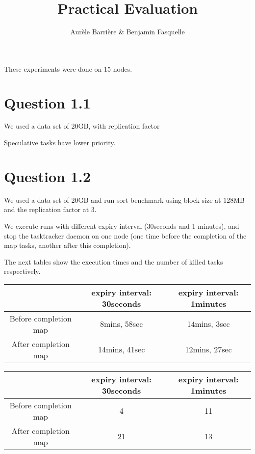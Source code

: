 \documentclass{article}
\author{Aur\`ele Barri\`ere \& Benjamin Fasquelle}
\title{Practical Evaluation}
\begin{document}
\maketitle

These experiments were done on 15 nodes.

\section*{Question 1.1}

We used a data set of 20GB, with replication factor

Speculative tasks have lower priority.

\section*{Question 1.2}

We used a data set of 20GB and run sort benchmark using block size at 128MB and the replication factor at 3.

We execute runs with different expiry interval (30seconds and 1 minutes), and stop the tasktracker daemon on one node (one time before the completion of the map tasks, another after this completion).

The next tables show the execution times and the number of killed tasks respectively.

\begin{center}
\begin{tabular}{|c|c|c|}
\hline
\ & expiry interval: 30seconds & expiry interval: 1minutes \\
\hline
Before completion map & 8mins, 58sec & 14mins, 3sec \\
\hline
After completion map & 14mins, 41sec & 12mins, 27sec\\
\hline
\end{tabular}
\end{center}

\begin{center}
\begin{tabular}{|c|c|c|}
\hline
\ & expiry interval: 30seconds & expiry interval: 1minutes \\
\hline
Before completion map & 4 & 11 \\
\hline
After completion map & 21 & 13 \\
\hline
\end{tabular}
\end{center}
\end{document}
